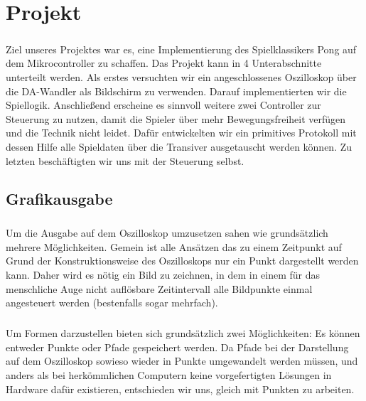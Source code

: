 \chapter{Projekt}

\paragraph*{}
Ziel unseres Projektes war es, eine Implementierung des Spielklassikers Pong auf dem Mikrocontroller zu schaffen. Das Projekt kann in 4 Unterabschnitte unterteilt werden. Als erstes versuchten wir ein angeschlossenes Oszilloskop über die DA-Wandler als Bildschirm zu verwenden. Darauf implementierten wir die Spiellogik. Anschließend erscheine es sinnvoll weitere zwei Controller zur Steuerung zu nutzen, damit die Spieler über mehr Bewegungsfreiheit verfügen und die Technik nicht leidet. Dafür entwickelten wir ein primitives Protokoll mit dessen Hilfe alle Spieldaten über die Transiver ausgetauscht werden können. Zu letzten beschäftigten wir uns mit der Steuerung selbst.

\section*{Grafikausgabe}

\paragraph*{}
Um die Ausgabe auf dem Oszilloskop umzusetzen sahen wie grundsätzlich mehrere Möglichkeiten. Gemein ist alle Ansätzen das zu einem Zeitpunkt auf Grund der Konstruktionsweise des Oszilloskops nur ein Punkt dargestellt werden kann. Daher wird es nötig ein Bild zu zeichnen, in dem in einem für das menschliche Auge nicht auflösbare Zeitintervall alle Bildpunkte einmal angesteuert werden (bestenfalls sogar mehrfach).

\paragraph*{}
Um Formen darzustellen bieten sich grundsätzlich zwei Möglichkeiten: Es können entweder Punkte oder Pfade gespeichert werden. Da Pfade bei der Darstellung auf dem Oszilloskop sowieso wieder in Punkte umgewandelt werden müssen, und anders als bei herkömmlichen Computern keine vorgefertigten Lösungen in Hardware dafür existieren, entschieden wir uns, gleich mit Punkten zu arbeiten. 

